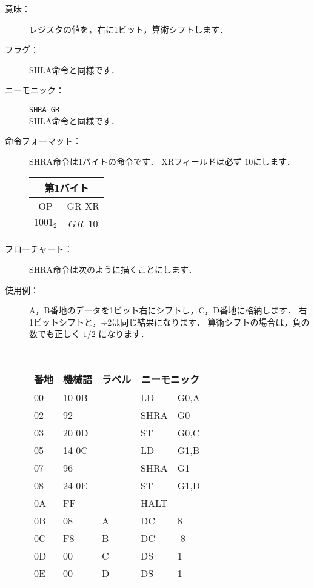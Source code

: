 \begin{center}
\epsfxsize=5cm
\end{center}

\begin{description}
\item[意味：]レジスタの値を，右に1ビット，算術シフトします．

\item[フラグ：]
SHLA命令と同様です．

\item[ニーモニック：]{\tt SHRA  GR} \\
SHLA命令と同様です．

\item[命令フォーマット：]SHRA命令は1バイトの命令です．
XRフィールドは必ず $10$にします．

\begin{tabular}{|c|c|} \hline
\multicolumn{2}{|c|}{第1バイト} \\
\hline
OP & GR XR \\
\hline
$1001_2$ & $GR$~$10$ \\
\hline
\end{tabular}

\item[フローチャート：]SHRA命令は次のように描くことにします．

\begin{flushleft}
\epsfxsize=3cm
\end{flushleft}

\item[使用例：]
A，B番地のデータを1ビット右にシフトし，C，D番地に格納します．
右1ビットシフトと，÷2は同じ結果になります．
算術シフトの場合は，負の数でも正しく $1/2$ になります．

{\tt
\begin{tabular}{|l|l|l|l l|} \hline
番地 & 機械語 & ラベル & \multicolumn{2}{|c|}{ニーモニック} \\
\hline
00 & 10 0B &   & LD   & G0,A \\
02 & 92    &   & SHRA & G0   \\
03 & 20 0D &   & ST   & G0,C \\
05 & 14 0C &   & LD   & G1,B \\
07 & 96    &   & SHRA & G1   \\
08 & 24 0E &   & ST   & G1,D \\
0A & FF    &   & HALT &      \\
0B & 08    & A & DC   & 8    \\
0C & F8    & B & DC   & -8   \\
0D & 00    & C & DS   & 1    \\
0E & 00    & D & DS   & 1    \\
\hline
\end{tabular}
}
\end{description}

